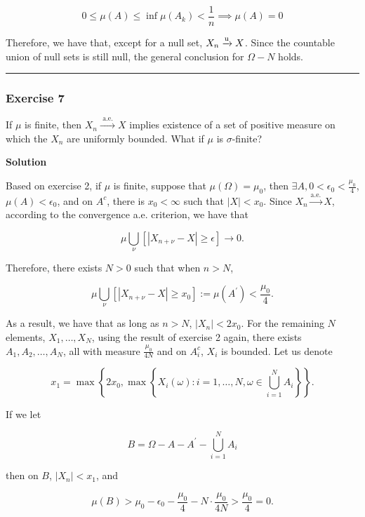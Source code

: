 \documentclass[
]{article}
\begin{document}
\[0 \le \mu(A) \le \inf \mu(A_k) < \frac{1}{n} \implies \mu(A) = 0\]

Therefore, we have that, except for a null set,
\(X_n\xrightarrow{\text u} X\). Since the countable union of null sets
is still null, the general conclusion for \(\Omega-N\) holds.

\begin{center}\rule{0.5\linewidth}{0.5pt}\end{center}

\hypertarget{exercise-7}{%
  \subsubsection{Exercise 7}\label{exercise-7}}

If \(\mu\) is finite, then
\(X_n \stackrel{\text { a.e. }}{\longrightarrow} X\) implies existence
of a set of positive measure on which the \(X_n\) are uniformly bounded.
What if \(\mu\) is \(\sigma\)-finite?

\textbf{Solution}

Based on exercise 2, if \(\mu\) is finite, suppose that
\(\mu(\Omega) =  \mu_0\), then
\(\exists A, 0 < \epsilon_0 < \frac{\mu_0}{4}\),
\(\mu(A) < \epsilon_0\), and on \(A^c\), there is \(x_0 < \infty\) such
that \(|X| < x_0\). Since \(X_n \xrightarrow{\text{a.e.}} X\), according
to the convergence a.e. criterion, we have that

\[\mu \bigcup_\nu\left[\left|X_{n+\nu}-X\right| \ge \epsilon\right] \rightarrow 0.\]

Therefore, there exists \(N > 0\) such that when \(n > N\),

\[\mu \bigcup_\nu\left[\left|X_{n+\nu}-X\right| \ge x_0 \right]:= \mu(A^\prime) < \frac{\mu_0}{4}.\]

As a result, we have that as long as \(n > N\), \(|X_n| < 2x_0\). For
the remaining \(N\) elements, \(X_1, \dots, X_N\), using the result of
exercise 2 again, there exists \(A_1, A_2, \dots, A_N\), all with
measure \(\frac{\mu_0}{4N}\) and on \(A_i^c\), \(X_i\) is bounded. Let
us denote

\[x_1 = \max\left\{2x_0, \max\left\{X_i(\omega): i=1,\dots,N, \omega\in \bigcup_{i=1}^N A_i\right\}\right\}.\]

If we let

\[B = \Omega - A - A^\prime - \bigcup_{i=1}^N A_i\]

then on \(B\), \(|X_n| < x_1\), and

\[\mu(B) > \mu_0 - \epsilon_0 - \frac{\mu_0}{4} - N\cdot\frac{\mu_0}{4N} > \frac{\mu_0}{4} = 0.\]
\end{document}

